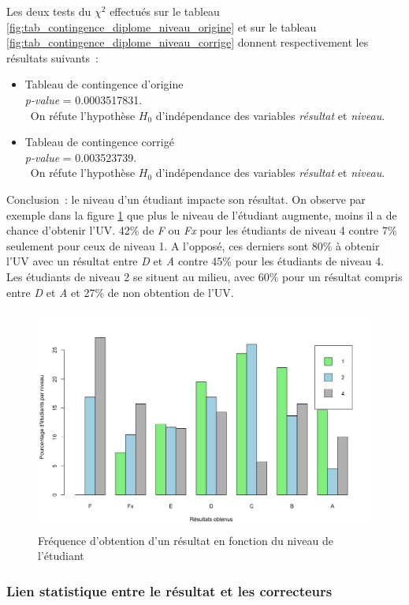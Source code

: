\documentclass[a4paper,11pt]{report}
\begin{document}
Les deux tests du $\chi^2$ effectués sur le tableau \ref{fig:tab_contingence_diplome_niveau_origine} et sur le tableau \ref{fig:tab_contingence_diplome_niveau_corrige} donnent respectivement les résultats suivants~:
\begin{itemize}
	\item Tableau de contingence d'origine
	\\ \textit{p-value} = 0.0003517831.
	\\ On réfute l'hypothèse $H_{0}$ d'indépendance des variables \textit{résultat} et \textit{niveau}.
	
	\item Tableau de contingence corrigé
	\\ \textit{p-value} = 0.003523739.
	\\ On réfute l'hypothèse $H_{0}$ d'indépendance des variables \textit{résultat} et \textit{niveau}.
\end{itemize}
Conclusion~: le niveau d'un étudiant impacte son résultat. On observe par exemple dans la figure \ref{fig:frequence_resultats_niveau} que plus le niveau de l'étudiant augmente, moins il a de chance d'obtenir l'UV. 42\% de \textit{F} ou \textit{Fx} pour les étudiants de niveau 4 contre 7\% seulement pour ceux de niveau 1. A l'opposé, ces derniers sont 80\% à obtenir l'UV avec un résultat entre \textit{D} et \textit{A} contre 45\% pour les étudiants de niveau 4. Les étudiants de niveau 2 se situent au milieu, avec 60\% pour un résultat compris entre \textit{D} et \textit{A} et 27\% de non obtention de l'UV.

\begin{figure}[H]
	\centering
	\captionsetup{justification=centering, margin=2cm}
	\includegraphics[width=.5\linewidth]{img/1-1-2-Ratio-resultat-niveau}
	\caption{\scriptsize Fréquence d'obtention d'un résultat en fonction du niveau de l'étudiant}
	\label{fig:frequence_resultats_niveau}
\end{figure}

\subsubsection{Lien statistique entre le résultat et les correcteurs}
\end{document}
